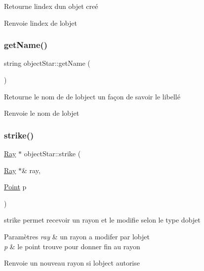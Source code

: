 Retourne l\textquotesingle{}index d\textquotesingle{}un objet creé \begin{DoxyReturn}{Renvoie}
l\textquotesingle{}index de l\textquotesingle{}objet 
\end{DoxyReturn}
\mbox{\label{classobject_star_a39fec832fe18f2e43ea36f7e842a6a82}} 
\subsubsection{\texorpdfstring{getName()}{getName()}}
{\footnotesize\ttfamily string object\+Star\+::get\+Name (\begin{DoxyParamCaption}{ }\end{DoxyParamCaption})}

Retourne le nom de de l\textquotesingle{}object un façon de savoir le libellé \begin{DoxyReturn}{Renvoie}
le nom de l\textquotesingle{}objet 
\end{DoxyReturn}
\mbox{\label{classobject_star_a5155713af07f8397057706a1eeb843ed}} 
\subsubsection{\texorpdfstring{strike()}{strike()}}
{\footnotesize\ttfamily \mbox{\hyperlink{class_ray}{Ray}} $\ast$ object\+Star\+::strike (\begin{DoxyParamCaption}\item[{\mbox{\hyperlink{class_ray}{Ray}} $\ast$\&}]{ray,  }\item[{\mbox{\hyperlink{class_point}{Point}}}]{p }\end{DoxyParamCaption})\hspace{0.3cm}{\ttfamily [virtual]}}

strike permet recevoir un rayon et le modifie selon le type d\textquotesingle{}objet 
\begin{DoxyParams}{Paramètres}
{\em ray} & un rayon a modifer par l\textquotesingle{}objet \\
\hline
{\em p} & le point trouve pour donner fin au rayon \\
\hline
\end{DoxyParams}
\begin{DoxyReturn}{Renvoie}
un nouveau rayon si l\textquotesingle{}object autorise 
\end{DoxyReturn}


